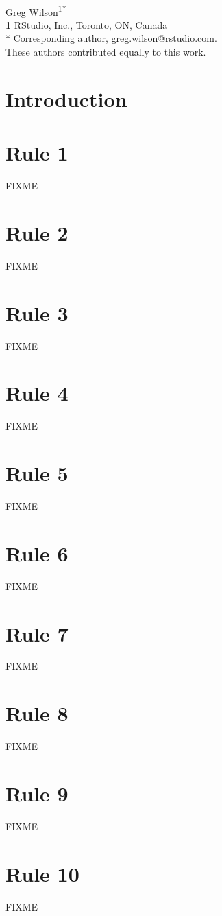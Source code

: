 \documentclass[10pt,letterpaper]{article}
\newcommand{\rulemajor}[1]{\section*{#1}}
\begin{document}
\vspace*{0.2in}

\begin{flushleft}
{\Large
\textbf{}
}
\newline
\\
{Greg Wilson}\textsuperscript{1{\ddag}*}
\\
\bigskip
\textbf{1} RStudio, Inc., Toronto, ON, Canada\\
* Corresponding author, greg.wilson@rstudio.com. \\
\bigskip
{\ddag} These authors contributed equally to this work.
\end{flushleft}

\section*{Introduction}

\rulemajor{Rule 1}

FIXME

\rulemajor{Rule 2}

FIXME

\rulemajor{Rule 3}

FIXME

\rulemajor{Rule 4}

FIXME

\rulemajor{Rule 5}

FIXME

\rulemajor{Rule 6}

FIXME

\rulemajor{Rule 7}

FIXME

\rulemajor{Rule 8}

FIXME

\rulemajor{Rule 9}

FIXME

\rulemajor{Rule 10}

FIXME

\nocite{*}

\end{document}
